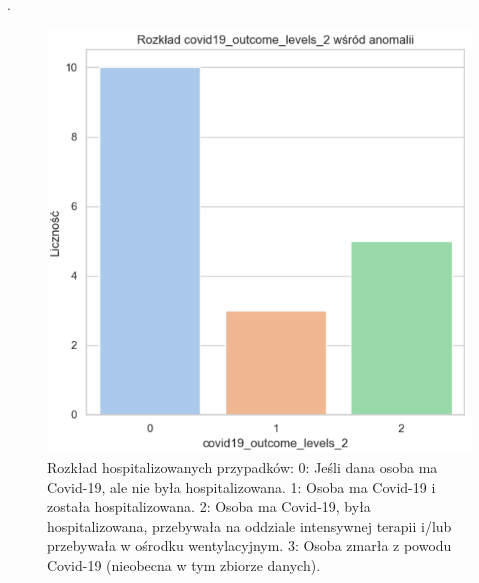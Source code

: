 \documentclass[a4paper,fleqn]{cas-dc}
\begin{document}
\newpage
.
\newpage
\begin{figure}[h]
	\includegraphics[scale=.80]{wykresy/wykres10.png}
	\caption{Rozkład hospitalizowanych przypadków: 0: Jeśli dana osoba ma Covid-19, ale nie była hospitalizowana.
1: Osoba ma Covid-19 i została hospitalizowana.
2: Osoba ma Covid-19, była hospitalizowana, przebywała na oddziale intensywnej terapii i/lub przebywała w ośrodku wentylacyjnym.
3: Osoba zmarła z powodu Covid-19 (nieobecna w tym zbiorze danych).}
	\label{FIG:1}
\end{figure}
\end{document}
